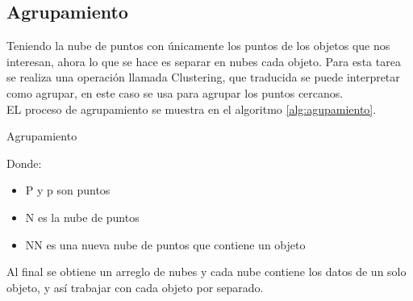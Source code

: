             
    \subsection{Agrupamiento}
    
        Teniendo la nube de puntos con únicamente los puntos de los objetos que nos interesan, ahora lo que se hace es separar en nubes cada objeto. Para esta tarea se realiza una operación llamada Clustering, que traducida se puede interpretar como agrupar, en este caso se usa para agrupar los puntos cercanos.\\
        
        EL proceso de agrupamiento se muestra en el \gls{algoritmo} \ref{alg:agupamiento}.        
        \begin{algorithm}
        	\caption{Agrupamiento}
        	\label{alg:agupamiento}
        \end{algorithm}
        
        Donde:
        \begin{itemize}
            \item P y p son puntos\\
            \item N es la nube de puntos\\
            \item NN es una nueva nube de puntos que contiene un objeto\\
        \end{itemize}  
        Al final se obtiene un arreglo de nubes y cada nube contiene los datos de un solo objeto, y así trabajar con cada objeto por separado.\\
        
        
        
            